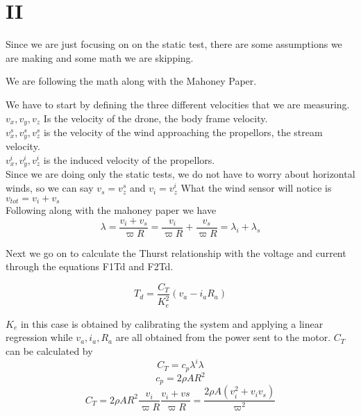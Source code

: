 \documentclass{article}
\begin{document}
\section{II}

Since we are just focusing on on the static test, there are some assumptions we are making and some math we are skipping. 

We are following the math along with the Mahoney Paper.

We have to start by defining the three different velocities that we are measuring.\\

$v_{x} , v_{y} , v_{z}$  Is the velocity of the drone, the body frame velocity. \\
$v^s_{x} , v^s_{y} , v^s_{z}$ is the velocity of the wind approaching the propellors, the stream velocity. \\
$v^i_{x} , v^i_{y} , v^i_{z}$ is the induced velocity of the propellors.\\

Since we are doing only the static tests, we do not have to worry about horizontal winds, so we can say $v_s = v^s_{z}$ and $v_i = v^i_{z}$
What the wind sensor will notice is $v_{tot} = v_{i} + v_{s}$\\

Following along with the mahoney paper we have
\begin{equation}
\lambda = \frac{v_{i} + v_{s}}{\varpi R}
= \frac{v_{i}}{\varpi R}+\frac{v_{s}}{\varpi R}
=\lambda_{i} + \lambda_{s}
\end{equation}

Next we go on to calculate the Thurst relationship with the voltage and current through the equations F1Td and F2Td.

\begin{equation}
T_{d} = \frac{C_{T}}{K^2_{e}}(v_{a} - i_{a}R_{a})
\end{equation}

$K_{e}$ in this case is obtained by calibrating the system and applying a linear regression while $v_{a}, i_{a}, R_{a}$ are all obtained from the power sent to the motor. $C_{T}$ can be calculated by 
\begin{equation}
C_{T} = c_{p} \lambda ^i \lambda 
\end{equation}
\begin{equation}
c_{p} = 2 \rho A R^2 \nonumber
\end{equation}
\begin{equation}
C_{T} = 2 \rho A R^2 \frac{v_{i}}{\varpi R}\frac{v_{i} + v{s}}{\varpi R}  = \frac{2 \rho A (v_{i}^2 + v_{i}v_{s})}{\varpi ^2}
\end{equation}
\end{document}
